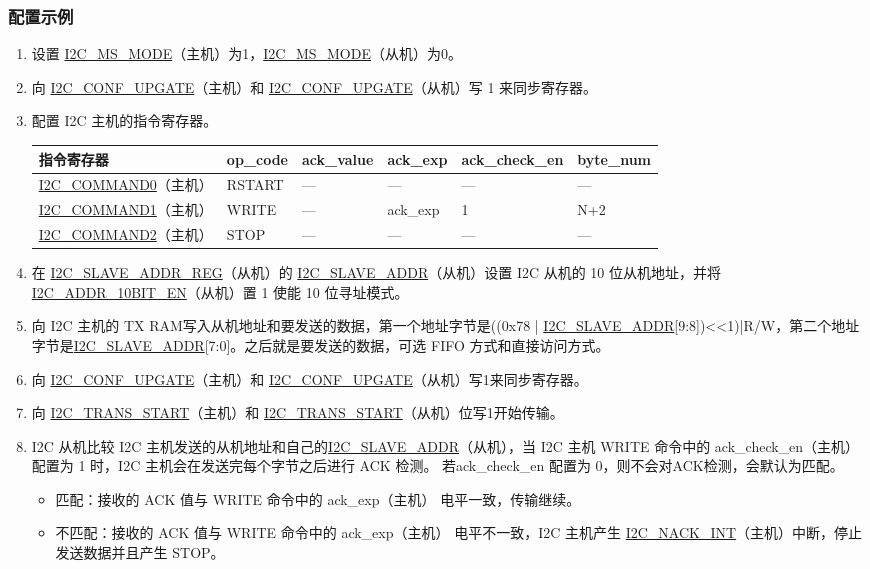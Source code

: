 \documentclass[main\_\_CN.tex]{subfiles}
\begin{document}
\subsubsection{配置示例}
\begin{enumerate}
\item 设置 \hyperref[fielddesc:I2CMSMODE]{I2C\_MS\_MODE}（主机）为1，\hyperref[fielddesc:I2CMSMODE]{I2C\_MS\_MODE}（从机）为0。
\item 向 \hyperref[fielddesc:I2CCONFUPGATE]{I2C\_CONF\_UPGATE}（主机）和 \hyperref[fielddesc:I2CCONFUPGATE]{I2C\_CONF\_UPGATE}（从机）写 1 来同步寄存器。
\item 配置 I2C 主机的指令寄存器。

\begin{longtable}{ | p{4cm} | p{2cm} | p{2cm} | p{2cm} |p{2.2cm} | p{1.8cm} |}
\hline\rowcolor{lightgray}
指令寄存器& op\_code & ack\_value&ack\_exp&ack\_check\_en&byte\_num  \\ \hline
\hyperref[fielddesc:I2CCOMMAND0]{I2C\_COMMAND0}（主机）& RSTART& ---&---&---&---  \\ \hline
\hyperref[fielddesc:I2CCOMMAND1]{I2C\_COMMAND1}（主机）& WRITE& ---&ack\_exp&1&N+2  \\ \hline
\hyperref[fielddesc:I2CCOMMAND2]{I2C\_COMMAND2}（主机）& STOP& ---&---&---&---  \\ \hline
\end{longtable}

\item 在 \hyperref[regdesc:I2CSLAVEADDRREG]{I2C\_SLAVE\_ADDR\_REG}（从机）的 \hyperref[fielddesc:I2CSLAVEADDR]{I2C\_SLAVE\_ADDR}（从机）设置 I2C 从机的 10 位从机地址，并将 \hyperref[fielddesc:I2CADDR10BITEN]{I2C\_ADDR\_10BIT\_EN}（从机）置 1 使能 10 位寻址模式。
\item 向 I2C 主机的 TX RAM写入从机地址和要发送的数据，第一个地址字节是((0x78 | \hyperref[fielddesc:I2CSLAVEADDR]{I2C\_SLAVE\_ADDR}[9:8])<<1)|R/W，第二个地址字节是\hyperref[fielddesc:I2CSLAVEADDR]{I2C\_SLAVE\_ADDR}[7:0]。之后就是要发送的数据，可选 FIFO 方式和直接访问方式。
\item 向 \hyperref[fielddesc:I2CCONFUPGATE]{I2C\_CONF\_UPGATE}（主机）和 \hyperref[fielddesc:I2CCONFUPGATE]{I2C\_CONF\_UPGATE}（从机）写1来同步寄存器。
\item 向 \hyperref[fielddesc:I2CTRANSSTART]{I2C\_TRANS\_START}（主机）和 \hyperref[fielddesc:I2CTRANSSTART]{I2C\_TRANS\_START}（从机）位写1开始传输。
\item I2C 从机比较 I2C 主机发送的从机地址和自己的\hyperref[fielddesc:I2CSLAVEADDR]{I2C\_SLAVE\_ADDR}（从机），当 I2C 主机 WRITE 命令中的 ack\_check\_en（主机）配置为 1 时，I2C 主机会在发送完每个字节之后进行 ACK 检测。 若ack\_check\_en 配置为 0，则不会对ACK检测，会默认为匹配。
\begin{itemize}
\item 匹配：接收的 ACK 值与 WRITE 命令中的 ack\_exp（主机） 电平一致，传输继续。
\item 不匹配：接收的 ACK 值与 WRITE 命令中的 ack\_exp（主机） 电平不一致，I2C 主机产生 \hyperref[int:i2c-nack]{I2C\_NACK\_INT}（主机）中断，停止发送数据并且产生 STOP。
\end{itemize}


\end{enumerate}
\end{document}
